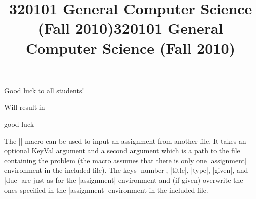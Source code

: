 \begin{latexcode}
\title{320101 General Computer Science (Fall 2010)}
\begin{testheading}[duration=one hour,min=60,reqpts=27]
  Good luck to all students!
\end{testheading}
\end{latexcode}

Will result in
\begin{center}
  \begin{minipage}{.9\textwidth}
\makeatletter
{}
\makeatother
\title{320101 General Computer Science (Fall 2010)}
\begin{testheading}[duration=one hour,min=60,reqpts=27]
  good luck
\end{testheading}
\end{minipage}
\end{center}

\begin{function}{}
  The || macro can be used to input an assignment from another file. It
  takes an optional KeyVal argument and a second argument which is a path to the file
  containing the problem (the macro assumes that there is only one |assignment|
  environment in the included file).  The keys |number|, |title|, |type|, |given|, and
  |due| are just as for the |assignment| environment and (if given) overwrite the ones
  specified in the |assignment| environment in the included file.
\end{function}

